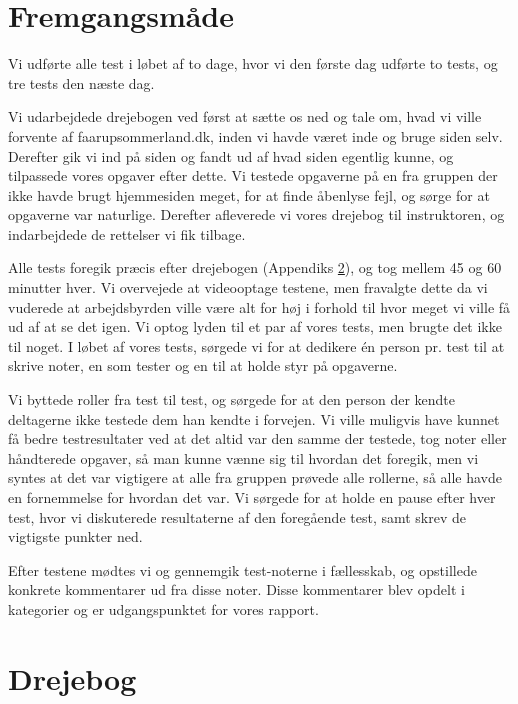 \documentclass[10pt,a4paper]{article}      %
\begin{document}
\section{Fremgangsmåde}

Vi udførte alle test i løbet af to dage, hvor vi den første dag udførte to
tests, og tre tests den næste dag.

Vi udarbejdede drejebogen ved først at sætte os ned og tale om, hvad vi ville
forvente af faarupsommerland.dk, inden vi havde været inde og bruge siden selv.
Derefter gik vi ind på siden og fandt ud af hvad siden egentlig kunne, og
tilpassede vores opgaver efter dette. Vi testede opgaverne på en fra gruppen der
ikke havde brugt hjemmesiden meget, for at finde åbenlyse fejl, og sørge for at
opgaverne var naturlige. Derefter afleverede vi vores drejebog til instruktoren,
og indarbejdede de rettelser vi fik tilbage.

Alle tests foregik præcis efter drejebogen (Appendiks \ref{apx:drejebog}), og
tog mellem 45 og 60 minutter hver.  Vi overvejede at videooptage testene, men
fravalgte dette da vi vuderede at arbejdsbyrden ville være alt for høj i forhold
til hvor meget vi ville få ud af at se det igen. Vi optog lyden til et par af
vores tests, men brugte det ikke til noget.  I løbet af vores tests, sørgede vi
for at dedikere én person pr. test til at skrive noter, en som tester og en til
at holde styr på opgaverne.

Vi byttede roller fra test til test, og sørgede for at den person der kendte
deltagerne ikke testede dem han kendte i forvejen. Vi ville muligvis have kunnet
få bedre testresultater ved at det altid var den samme der testede, tog noter
eller håndterede opgaver, så man kunne vænne sig til hvordan det foregik, men vi
syntes at det var vigtigere at alle fra gruppen prøvede alle rollerne, så alle
havde en fornemmelse for hvordan det var.  Vi sørgede for at holde en pause
efter hver test, hvor vi diskuterede resultaterne af den foregående test, samt
skrev de vigtigste punkter ned. 

Efter testene mødtes vi og gennemgik test-noterne i fællesskab, og opstillede
konkrete kommentarer ud fra disse noter. Disse kommentarer blev opdelt i
kategorier og er udgangspunktet for vores rapport.


\section{Drejebog}
\label{apx:drejebog}
\end{document}
